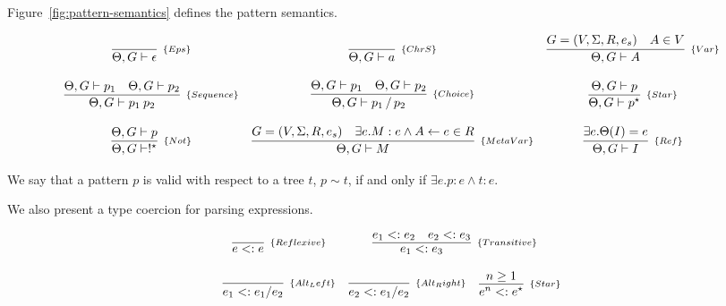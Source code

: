 Figure~\ref{fig:pattern-semantics} defines the pattern semantics.

\begin{figure*}[!ht]
    \centering
    \[
        \begin{array}{ccc}
            \infer[_{\{Eps\}}]{\Theta, G \vdash \epsilon}{} &
            \infer[_{\{ChrS\}}]{\Theta, G \vdash a}{} &
            \infer[_{\{Var\}}]{\Theta, G \vdash A}{G = (V, \Sigma, R, e_s) & A \in V}
            \\ \\
            \infer[_{\{Sequence\}}]{\Theta, G \vdash p_1\:p_2}{\Theta, G \vdash p_1 & \Theta, G \vdash p_2} &
            \infer[_{\{Choice\}}]{\Theta, G \vdash p_1 \,/\, p_2}{\Theta, G \vdash p_1 & \Theta, G \vdash p_2} &
            \infer[_{\{Star\}}]{\Theta, G \vdash p^\star}{\Theta, G \vdash p} 
            \\ \\
            \infer[_{\{Not\}}]{\Theta, G \vdash !^\star}{\Theta, G \vdash p} &
            \infer[_{\{MetaVar\}}]{\Theta, G \vdash M}{G = (V, \Sigma, R, e_s) & \exists e. M : e \land A \leftarrow e \in R} &
            \infer[_{\{Ref\}}]{\Theta, G \vdash I}{\exists e. \Theta(I) = e}
        \end{array}
    \]
    \caption{Pattern expressions semantics.}
    \label{fig:pattern-semantics}
\end{figure*}

\begin{definition}
    We say that a pattern \(p\) is valid with respect to a tree \(t\), \(p \sim t\),
    if and only if \(\exists e . p : e \land t : e\).
\end{definition}

We also present a type coercion for parsing expressions.
\begin{figure*}[ht]
    \[
        \begin{array}{ccc}
            \infer[_{\{Reflexive\}}]{e <: e}{} &
            \multicolumn{2}{c}{
                \infer[_{\{Transitive\}}]{e_1 <: e_3}{e_1 <: e_2 & e_2 <: e_3}
            } \\ \\

            \infer[_{\{Alt_Left\}}]{e_1 <: e_1 / e_2}{} &
            \infer[_{\{Alt_Right\}}]{e_2 <: e_1 / e_2}{} &
            \infer[_{\{Star\}}]{e^n <: e^\star}{n \geq 1} 
        \end{array}
    \]
    \centering
    \caption{Type coercions}
    \label{fig:type-coercion}
\end{figure*}


